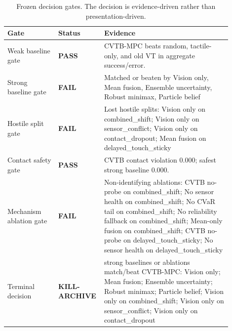 \begin{table}[t]
\centering
\caption{Frozen decision gates. The decision is evidence-driven rather than presentation-driven.}
\label{tab:gates}
\small
\begin{tabular}{p{0.22\linewidth}p{0.13\linewidth}p{0.55\linewidth}}
\toprule
Gate & Status & Evidence \\
\midrule
Weak baseline gate & \textbf{PASS} & CVTB-MPC beats random, tactile-only, and old VT in aggregate success/error. \\
Strong baseline gate & \textbf{FAIL} & Matched or beaten by Vision only, Mean fusion, Ensemble uncertainty, Robust minimax, Particle belief \\
Hostile split gate & \textbf{FAIL} & Lost hostile splits: Vision only on combined\_shift; Vision only on sensor\_conflict; Vision only on contact\_dropout; Mean fusion on delayed\_touch\_sticky \\
Contact safety gate & \textbf{PASS} & CVTB contact violation 0.000; safest strong baseline 0.000. \\
Mechanism ablation gate & \textbf{FAIL} & Non-identifying ablations: CVTB no-probe on combined\_shift; No sensor health on combined\_shift; No CVaR tail on combined\_shift; No reliability fallback on combined\_shift; Mean-only fusion on combined\_shift; CVTB no-probe on delayed\_touch\_sticky; No sensor health on delayed\_touch\_sticky \\
Terminal decision & \textbf{KILL-ARCHIVE} & strong baselines or ablations match/beat CVTB-MPC: Vision only; Mean fusion; Ensemble uncertainty; Robust minimax; Particle belief; Vision only on combined\_shift; Vision only on sensor\_conflict; Vision only on contact\_dropout \\
\bottomrule
\end{tabular}
\end{table}
